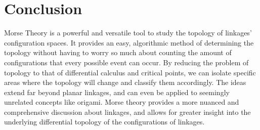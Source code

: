 \documentclass{article}
\begin{document}
\section{Conclusion}
Morse Theory is a powerful and versatile tool to study the topology of linkages' configuration spaces. It provides an easy, algorithmic method of determining the topology without having to worry so much about counting the amount of configurations that every possible event can occur. By reducing the problem of topology to that of differential calculus and critical points, we can isolate specific areas where the topology will change and classify them accordingly. The ideas extend far beyond planar linkages, and can even be applied to seemingly unrelated concepts like origami. Morse theory provides a more nuanced and comprehensive discussion about linkages, and allows for greater insight into the underlying differential topology of the configurations of linkages. 




\end{document}
